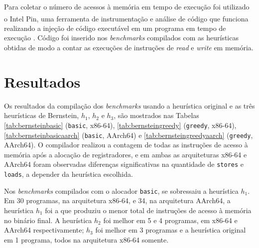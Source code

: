 \documentclass[
	12pt,				%
	openright,			%
	twoside,			%
	a4paper,			%
	tcc,			%
	]{ABNT-DC-UEL}
\begin{document}
Para coletar o número de acessos à memória em tempo de execução foi utilizado o Intel\textsuperscript{\textregistered} Pin, uma ferramenta de instrumentação e análise de código que funciona realizando a injeção de código executável em um programa em tempo de execução \cite{bach:10}. Código foi inserido nos \textit{benchmarks} compilados com as heurísticas obtidas de modo a contar as execuções de instruções de \textit{read} e \textit{write} em memória.

\chapter{Resultados} \label{cap:resultados}

Os resultados da compilação dos \textit{benchmarks} usando a heurística original e as três heurísticas de Bernstein, $h_1$, $h_2$ e $h_3$, são mostrados nas Tabelas \ref{tab:bernsteinbasic} (\texttt{basic}, x86-64), \ref{tab:bernsteingreedy} (\texttt{greedy}, x86-64), \ref{tab:bernsteinbasicaarch} (\texttt{basic}, AArch64) e \ref{tab:bernsteingreedyaarch} (\texttt{greedy}, AArch64). O compilador realizou a contagem de todas as instruções de acesso à memória após a alocação de registradores, e em ambas as arquiteturas x86-64 e AArch64 foram observadas diferenças significativas na quantidade de \texttt{stores} e \texttt{loads}, a depender da heurística escolhida. 

Nos \textit{benchmarks} compilados com o alocador \texttt{basic}, se sobressaiu a heurística $h_1$. Em 30 programas, na arquitetura x86-64, e 34, na arquitetura AArch64, a heurística $h_1$ foi a que produziu o menor total de instruções de acesso à memória no binário final. A heurística $h_2$ foi melhor em 5 e 4 programas, em x86-64 e AArch64 respectivamente; $h_3$ foi melhor em 3 programas e a heurística original em 1 programa, todos na arquitetura x86-64 somente.

 \bernsteinbasicspills
\end{document}

